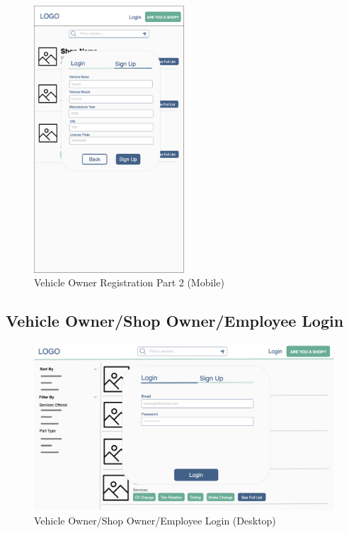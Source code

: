 \documentclass[12pt, titlepage]{article}
\begin{document}
\begin{figure}[H]
	\centering
	\includegraphics[width=0.5\textwidth]{mockups/Vehicle Owner Sign Up (Part 2) (Mobile).png}
	\caption{Vehicle Owner Registration \textemdash{} Part 2 (Mobile)}
\end{figure}

\subsection{Vehicle Owner/Shop Owner/Employee Login}

\begin{figure}[H]
	\centering
	\includegraphics[width=\textwidth]{mockups/Vehicle-Shop Owner Login Popup (Desktop).png}
	\caption{Vehicle Owner/Shop Owner/Employee Login (Desktop)}
\end{figure}
\end{document}
